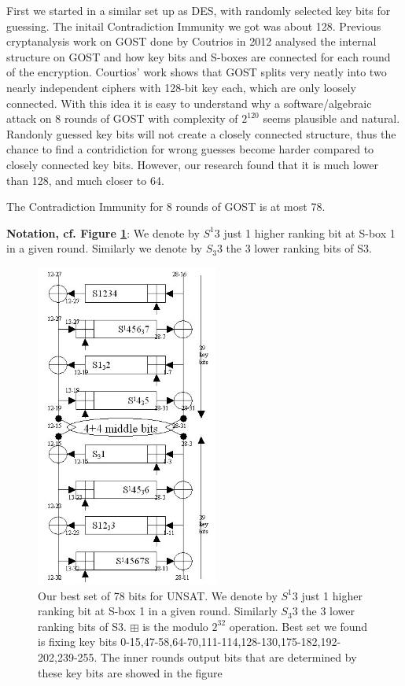 First we started in a similar set up as DES, with randomly selected key bits for guessing. The initail Contradiction Immunity we got was about 128. Previous cryptanalysis work on GOST done by Coutrios in 2012 \cite{gostdc2} analysed the internal structure on GOST and how key bits and S-boxes are connected for each round of the encryption. Courtios' work \cite{gostdc2} shows that GOST splits very neatly into two nearly independent ciphers with 128-bit key each, which are only loosely connected. With this idea it is easy to understand why a software/algebraic attack on 8 rounds of GOST with complexity of $2^{120}$ seems plausible and natural. Randonly guessed key bits will not create a closely connected structure, thus the chance to find a contridiction for wrong guesses become harder compared to closely connected key bits.
However, our research found that it is much lower than 128,
and much closer to 64. 
\begin{lemma}
	The Contradiction Immunity for 8 rounds of GOST is at most 78.
\end{lemma}


{\bf Notation, cf. Figure \ref{Gost81optimal4KPUNSAT78}}:
We denote by $S^{1}3$ just 1 higher ranking bit at S-box 1 in a given round.
Similarly we denote by $S_{3}3$ the 3 lower ranking bits of S3.

\begin{figure}[h]
	\centering
	\includegraphics[width=60mm]{./pics/gost81optimal4KP.jpg}
	\caption[Our best set of 78 bits for UNSAT]{Our best set of 78 bits for UNSAT. We denote by $S^{1}3$ just 1 higher ranking bit at S-box 1 in a given round.
		Similarly $S_{3}3$ the 3 lower ranking bits of S3. $\boxplus$ is the modulo $2^{32}$ operation. Best set we found is fixing key bits 0-15,47-58,64-70,111-114,128-130,175-182,192-202,239-255. The inner rounds output bits that are determined by these key bits are showed in the figure   }
	\label{Gost81optimal4KPUNSAT78}
\end{figure}

